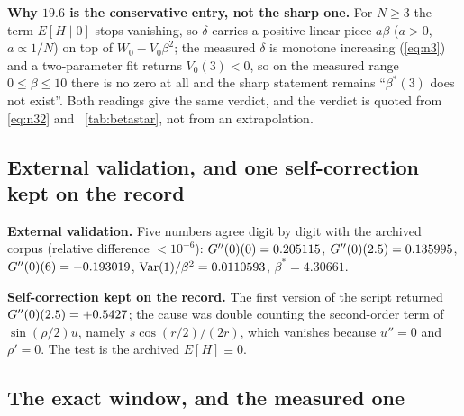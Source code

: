 \noindent
\textbf{Why $19.6$ is the conservative entry, not the sharp one.} For $N\ge3$ the term $E[H\mid0]$ stops
vanishing, so $\delta$ carries a positive linear piece $a\beta$ ($a>0$, $a\propto1/N$) on top of
$W_0-V_0\beta^{2}$; the measured $\delta$ is monotone increasing (\eqref{eq:n3}) and a two-parameter fit
returns $V_0(3)<0$, so on the measured range $0\le\beta\le10$ there is no zero at all and the sharp
statement remains ``$\beta^{*}(3)$ does not exist''. Both readings give the same verdict, and the verdict
is quoted from \eqref{eq:n32} and \tablename~\ref{tab:betastar}, not from an extrapolation. \LE
{}

\subsection{External validation, and one self-correction kept on the record}

\textbf{External validation.} Five numbers agree digit by digit with the archived corpus (relative
difference $<10^{-6}$): $G''(0)(0)=0.205115$, $G''(0)(2.5)=0.135995$, $G''(0)(6)=-0.193019$,
$\operatorname{Var}(1)/\beta^{2}=0.0110593$, $\beta^{*}=4.30661$. \LE
{}

\noindent
\textbf{Self-correction kept on the record.} The first version of the script returned
$G''(0)(2.5)=+0.5427$; the cause was double counting the second-order term of $\sin(\rho/2)u$, namely
$s\cos(r/2)/(2r)$, which vanishes because $u''=0$ and $\rho'=0$. The test is the archived
$E[H]\equiv0$. \LE
{}

\subsection{The exact window, and the measured one}
\label{sec:window}

